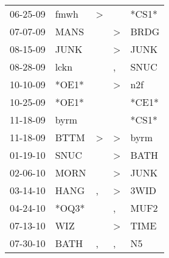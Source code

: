\begin{supertabular}{p{0.07\textwidth}p{0.06\textwidth}p{0.02\textwidth}p{0.02\textwidth}p{0.06\textwidth}}
          06-25-09\textsuperscript{} &           fmwh\textsuperscript{} &     \textgreater &                  &                            *CS1* \\
          07-07-09\textsuperscript{} &           MANS\textsuperscript{} &                  &     \textgreater &           BRDG\textsuperscript{} \\
          08-15-09\textsuperscript{} &           JUNK\textsuperscript{} &                  &     \textgreater &           JUNK\textsuperscript{} \\
          08-28-09\textsuperscript{} &           lckn\textsuperscript{} &                  &                , &           SNUC\textsuperscript{} \\
          10-10-09\textsuperscript{} &                            *OE1* &                  &     \textgreater &            n2f\textsuperscript{} \\
          10-25-09\textsuperscript{} &                            *OE1* &                  &                  &                            *CE1* \\
          11-18-09\textsuperscript{} &           byrm\textsuperscript{} &                  &                  &                            *CS1* \\
          11-18-09\textsuperscript{} &           BTTM\textsuperscript{} &     \textgreater &     \textgreater &           byrm\textsuperscript{} \\
          01-19-10\textsuperscript{} &           SNUC\textsuperscript{} &                  &     \textgreater &           BATH\textsuperscript{} \\
          02-06-10\textsuperscript{} &           MORN\textsuperscript{} &                  &     \textgreater &           JUNK\textsuperscript{} \\
          03-14-10\textsuperscript{} &           HANG\textsuperscript{} &                , &     \textgreater &           3WID\textsuperscript{} \\
          04-24-10\textsuperscript{} &                            *OQ3* &                  &                , &           MUF2\textsuperscript{} \\
          07-13-10\textsuperscript{} &            WIZ\textsuperscript{} &                  &     \textgreater &           TIME\textsuperscript{} \\
          07-30-10\textsuperscript{} &           BATH\textsuperscript{} &                , &                , &             N5\textsuperscript{} \\

\end{supertabular}
